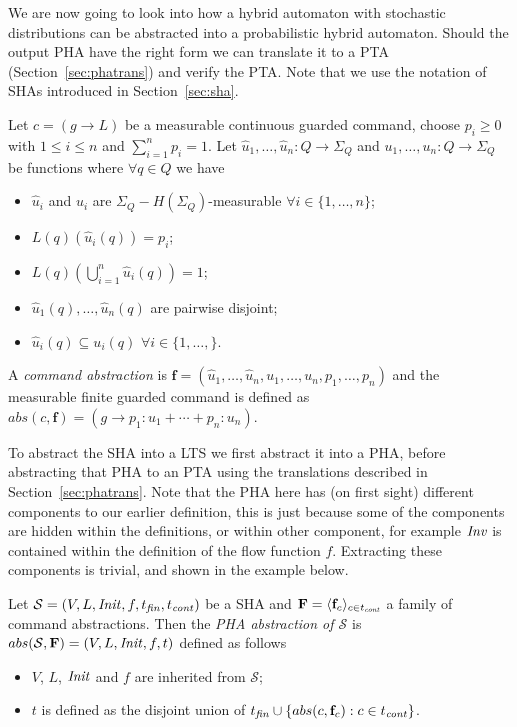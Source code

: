 We are now going to look into how a hybrid automaton with stochastic distributions can be abstracted into a probabilistic hybrid automaton. Should the output PHA have the right form we can translate it to a PTA (Section~\ref{sec:phatrans}) and verify the PTA.
Note that we use the notation of SHAs introduced in Section~\ref{sec:sha}.

\begin{defi}
Let $c=(g\rightarrow L)$ be a measurable continuous guarded command, choose $p_{i}\geq0$ with $1\leq i\leq n$ and $\sum_{i=1}^{n} p_{i} = 1$. Let
$\hat{u}_{1},\ldots,\hat{u}_{n}:Q\rightarrow \Sigma_{Q}$ and $u_{1},\ldots,u_{n} : Q\rightarrow \Sigma_{Q}$ be functions where $\forall q\in Q$ we have
\begin{itemize}
    \item $\hat{u}_{i}$ and $u_{i}$ are $\Sigma_{Q}-H(\Sigma_{Q})$-measurable $\forall i\in\{1,\ldots,n\}$;
    \item $L(q)(\hat{u}_{i}(q)) = p_{i}$;
    \item $L(q)(\bigcup_{i=1}^{n}\hat{u}_{i}(q)) = 1$;
    \item $\hat{u}_{1}(q),\ldots,\hat{u}_{n}(q)$ are pairwise disjoint;
    \item $\hat{u}_{i}(q)\subseteq u_{i}(q)$ $\forall i\in\{1,\ldots,\}$.
\end{itemize}
A \emph{command abstraction} is $\mathbf{f}=(\hat{u}_{1},\ldots,\hat{u}_{n},u_{1},\ldots,u_{n},p_{1},\ldots,p_{n})$ and the measurable finite guarded command is defined as $abs(c,\mathbf{f}) = (g\rightarrow p_{1}:u_{1}+\cdots+p_{n}:u_{n})$.
\end{defi}

To abstract the SHA into a LTS we first abstract it into a PHA, before abstracting that PHA to an PTA using the translations described in Section~\ref{sec:phatrans}. Note that the PHA here has (on first sight) different components to our earlier definition, this is just because some of the components are hidden within the definitions, or within other component, for example $\mathit{Inv}$ is contained within the definition of the flow function $f$. Extracting these components is trivial, and shown in the example below.

\begin{defi}
Let $\mathcal{S}=(V,L,\mathit{Init},f,t_{\mathit{fin}},t_{\mathit{cont}})$ be a SHA and $\mathbf{F}=\langle\mathbf{f}_{c}\rangle_{c\in t_{\mathit{cont}}}$ a family of command abstractions. Then the \emph{PHA abstraction of $\mathcal{S}$} is $abs(\mathcal{S},\mathbf{F})=(V,L,\mathit{Init},f,t)$ defined as follows
\begin{itemize}
    \item $V$, $L$, $\mathit{Init}$ and $f$ are inherited from $\mathcal{S}$;
    \item $t$ is defined as the disjoint union of $t_{\mathit{fin}}\cup\{abs(c,\mathbf{f}_{c}) : c \in t_{\mathit{cont}}\}$.
\end{itemize}
\end{defi}


